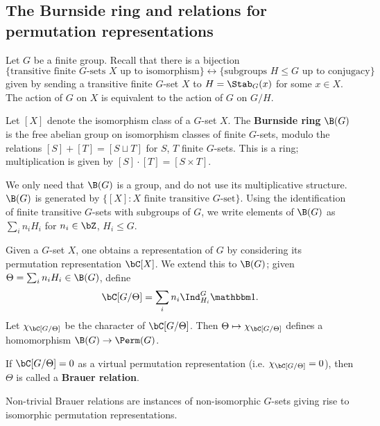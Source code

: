 \subsection{The Burnside ring and relations for permutation representations}

Let $G$ be a finite group. Recall that there is a bijection  
\[ \{ \text{transitive finite }G\text{-sets } X  \text{ up to isomorphism}\}\leftrightarrow  \{ \text{subgroups } H \leq G \text{ up to conjugacy} \} \] 
given by sending a transitive finite $G$-set $X$ to $H = \Stab_{G}(x)$ for some $x \in X$.  The action of $G$ on $X$ is equivalent to the action of $G$ on $G / H$. 

\begin{defn}\label{burnside}
Let $[X]$ denote the isomorphism class of a $G$-set $X$. 
The \textbf{Burnside ring} $\B(G)$ is the free abelian group on isomorphism classes of finite $G$-sets, modulo the relations  $[S] + [T] = [S \sqcup T]$ for $S$, $T$ finite $G$-sets. This is a ring; multiplication is given by $[S] \cdot [T] = [S \times T]$.
\end{defn}

We only need that $\B(G)$ is a group, and do not use its multiplicative structure. $\B(G)$ is generated by $\{ [X] \colon X \text{ finite transitive } G\text{-set}\}$. Using the identification of finite transitive $G$-sets with subgroups of $G$, we write elements of $\B(G)$ as $\sum_i n_i H_i$ for $n_i \in \bZ$, $H_i \leq G$. 

\begin{defn}
    Given a $G$-set $X$, one obtains a representation of $G$ by considering its permutation representation $\bC[X]$. We extend this to $\B(G)$; given $\Theta  = \sum_i n_i H_i \in \B(G)$, define 
    \[ \bC[G / \Theta ] = \sum_i n_i \Ind_{H_i}^G \trivial. \]
    Let $\chi_{\bC[G / \Theta]}$ be the character of $\bC[G / \Theta]$. Then  $\Theta \mapsto \chi_{\bC[G / \Theta]}$ defines a homomorphism $\B(G) \to \Perm(G)$.
\end{defn}

\begin{defn}
If $\bC[G / \Theta] = 0$ as a virtual permutation representation (i.e. $\chi_{\bC[G / \Theta]} = 0$), then $\Theta$ is called a  \textbf{Brauer relation}.
\end{defn}

Non-trivial Brauer relations are instances of non-isomorphic $G$-sets giving rise to isomorphic permutation representations. 

